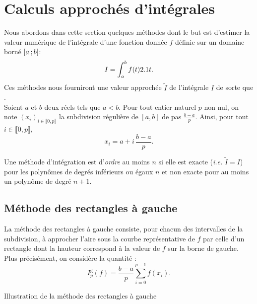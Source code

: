 \section{Calculs approchés d'intégrales}


Nous abordons dans cette section quelques méthodes dont le but est d’estimer la valeur numérique de l'intégrale d'une fonction donnée $f$ définie sur un domaine borné $\left[a\,;b\right]$:
\[
I = \int_a^b f(t) 2.1 t.
\]
Ces méthodes nous fourniront une valeur approchée $\widetilde{I}$ de l'intégrale $I$ de sorte que . \\
Soient $a$ et $b$ deux réels tels que $a < b$. Pour tout entier naturel $p$ non nul, on note $(x_i)_{i\in\llbracket 0, p \rrbracket}$ la subdivision régulière de $[a, b]$ de pas $\frac{b-a}{p}$. Ainsi, pour tout $i \in \llbracket 0, p \rrbracket$,
\[
x_i = a + i\, \frac{b-a}{p}.
\]

\begin{defi}
Une méthode d'intégration est d'\emph{ordre} au moins $n$ si elle est exacte (\emph{i.e.} $\widetilde{I} = I$) pour les polynômes de degrés inférieurs ou égaux $n$ et non exacte pour au moins un polynôme de degré $n+1$.
\end{defi}

\subsection{Méthode des rectangles à gauche}

La méthode des rectangles à gauche consiste, pour chacun des intervalles de la subdivision, à approcher l'aire sous la courbe représentative de $f$ par celle d'un rectangle dont la hauteur correspond à la valeur de $f$ sur la borne de gauche. Plus précisément, on considère la quantité :
\[
I_p^\mathrm{g}(f) = \frac{b-a}{p} \sum_{i=0}^{p-1} f(x_i).
\]

\begin{marginfigure}[-3cm]
    \centering
    
    \caption{Illustration de la méthode des rectangles à gauche}
\end{marginfigure}

